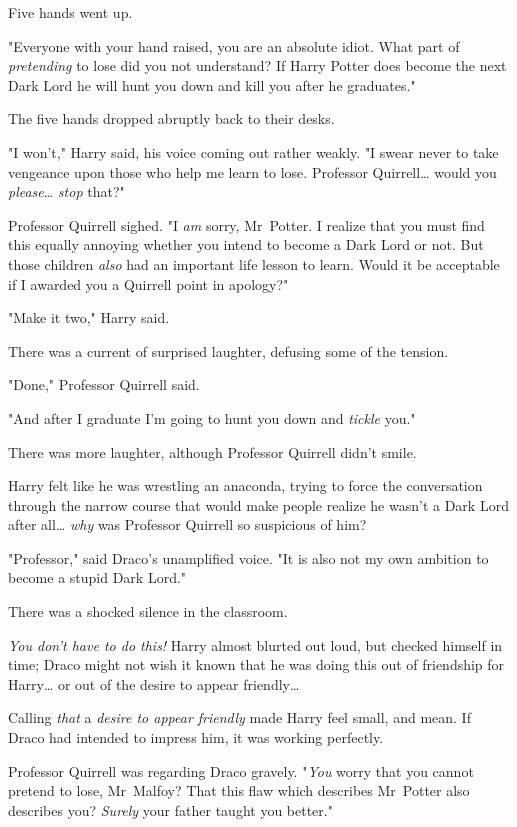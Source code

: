 Five hands went up.

"Everyone with your hand raised, you are an absolute idiot. What part of
\emph{pretending} to lose did you not understand? If Harry Potter does become
the next Dark Lord he will hunt you down and kill you after he graduates."

The five hands dropped abruptly back to their desks.

"I won't," Harry said, his voice coming out rather weakly. "I swear never to
take vengeance upon those who help me learn to lose. Professor Quirrell{\ldots}
would you \emph{please}{\ldots} \emph{stop} that?"

Professor Quirrell sighed. "I \emph{am} sorry, Mr~Potter. I realize that you
must find this equally annoying whether you intend to become a Dark Lord or
not. But those children \emph{also} had an important life lesson to learn.
Would it be acceptable if I awarded you a Quirrell point in apology?"

"Make it two," Harry said.

There was a current of surprised laughter, defusing some of the tension.

"Done," Professor Quirrell said.

"And after I graduate I'm going to hunt you down and \emph{tickle} you."

There was more laughter, although Professor Quirrell didn't smile.

Harry felt like he was wrestling an anaconda, trying to force the conversation
through the narrow course that would make people realize he wasn't a Dark Lord
after all{\ldots} \emph{why} was Professor Quirrell so suspicious of him?

"Professor," said Draco's unamplified voice. "It is also not my own ambition to
become a stupid Dark Lord."

There was a shocked silence in the classroom.

\emph{You don't have to do this!} Harry almost blurted out loud, but checked
himself in time; Draco might not wish it known that he was doing this out of
friendship for Harry{\ldots} or out of the desire to appear friendly{\ldots}

Calling \emph{that} a \emph{desire to appear friendly} made Harry feel small,
and mean. If Draco had intended to impress him, it was working perfectly.

Professor Quirrell was regarding Draco gravely. "\emph{You} worry that you
cannot pretend to lose, Mr~Malfoy? That this flaw which describes Mr~Potter
also describes you? \emph{Surely} your father taught you better."

